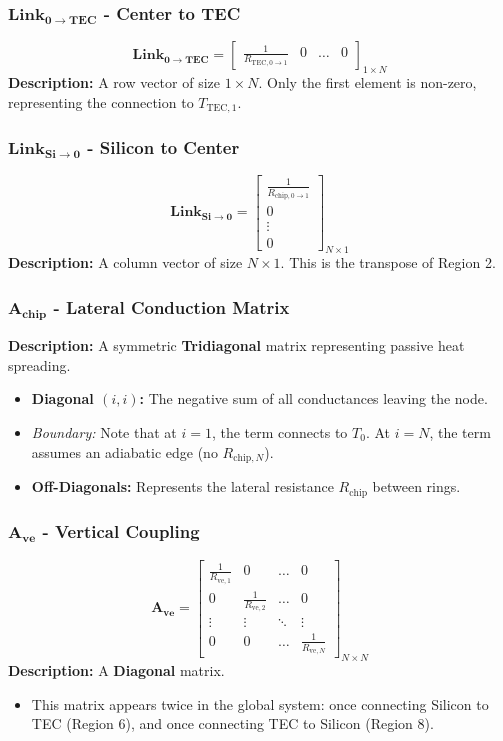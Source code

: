 \documentclass[10pt,a4paper,twocolumn]{article}
\begin{document}
\subsubsection{$\mathbf{Link_{0 \to TEC}}$ - Center to TEC}
$$ \mathbf{Link_{0 \to TEC}} = \begin{bmatrix} \frac{1}{R_{\text{TEC}, 0\to 1}} & 0 & \dots & 0 \end{bmatrix}_{1 \times N} $$
\textbf{Description:} A row vector of size $1 \times N$. Only the first element is non-zero, representing the connection to $T_{\text{TEC},1}$.

\subsubsection{$\mathbf{Link_{Si \to 0}}$ - Silicon to Center}
$$ \mathbf{Link_{Si \to 0}} = \begin{bmatrix} \frac{1}{R_{\text{chip}, 0\to 1}} \\ 0 \\ \vdots \\ 0 \end{bmatrix}_{N \times 1} $$
\textbf{Description:} A column vector of size $N \times 1$. This is the transpose of Region 2.

\subsubsection{$\mathbf{A_{chip}}$ - Lateral Conduction Matrix}
\textbf{Description:} A symmetric \textbf{Tridiagonal} matrix representing passive heat spreading.
\begin{itemize}
    \item \textbf{Diagonal $(i,i)$:} The negative sum of all conductances leaving the node.
    \item \textit{Boundary:} Note that at $i=1$, the term connects to $T_0$. At $i=N$, the term assumes an adiabatic edge (no $R_{\text{chip},N}$).
    \item \textbf{Off-Diagonals:} Represents the lateral resistance $R_{\text{chip}}$ between rings.
\end{itemize}

\subsubsection{$\mathbf{A_{ve}}$ - Vertical Coupling}
$$ \mathbf{A_{ve}} = \begin{bmatrix} \frac{1}{R_{\text{ve},1}} & 0 & \dots & 0 \\ 0 & \frac{1}{R_{\text{ve},2}} & \dots & 0 \\ \vdots & \vdots & \ddots & \vdots \\ 0 & 0 & \dots & \frac{1}{R_{\text{ve},N}} \end{bmatrix}_{N \times N} $$
\textbf{Description:} A \textbf{Diagonal} matrix.
\begin{itemize}
    \item This matrix appears twice in the global system: once connecting Silicon to TEC (Region 6), and once connecting TEC to Silicon (Region 8).
\end{itemize}
\end{document}
